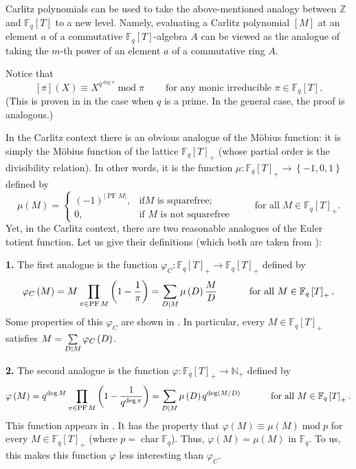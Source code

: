 \documentclass[numbers=enddot,12pt,final,onecolumn,notitlepage]{scrartcl}%
\theoremstyle{definition}
\let\sumnonlimits\sum
\let\prodnonlimits\prod
\renewcommand{\sum}{\sumnonlimits\limits}
\renewcommand{\prod}{\prodnonlimits\limits}
\begin{document}
Carlitz polynomials can be used to take the above-mentioned analogy between
$\mathbb{Z}$ and $\mathbb{F}_{q}\left[  T\right]  $ to a new level. Namely,
evaluating a Carlitz polynomial $\left[  M\right]  $ at an element $a$ of a
commutative $\mathbb{F}_{q}\left[  T\right]  $-algebra $A$ can be viewed as
the analogue of taking the $m$-th power of an element $a$ of a commutative
ring $A$.

Notice that%
\begin{equation}
\left[  \pi\right]  \left(  X\right)  \equiv X^{q^{\deg\pi}}\operatorname{mod}%
\pi\ \ \ \ \ \ \ \ \ \ \text{for any monic irreducible }\pi\in\mathbb{F}%
_{q}\left[  T\right]  . \label{carlitz-piX}%
\end{equation}
(This is proven in \cite[Theorem 2.11]{kc-carlitz} in the case when $q$ is a
prime. In the general case, the proof is analogous.)

In the Carlitz context there is an obvious analogue of the M\"{o}bius
function: it is simply the M\"{o}bius function of the lattice $\mathbb{F}%
_{q}\left[  T\right]  _{+}$ (whose partial order is the divisibility
relation). In other words, it is the function $\mu:\mathbb{F}_{q}\left[
T\right]  _{+}\rightarrow\left\{  -1,0,1\right\}  $ defined by%
\[
\mu\left(  M\right)  =%
\begin{cases}
\left(  -1\right)  ^{\left\vert \operatorname*{PF}M\right\vert }, & \text{if
}M\text{ is squarefree;}\\
0, & \text{if }M\text{ is not squarefree}%
\end{cases}
\ \ \ \ \ \ \ \ \ \ \text{for all }M\in\mathbb{F}_{q}\left[  T\right]  _{+}.
\]
Yet, in the Carlitz context, there are two reasonable analogues of the Euler
totient function. Let us give their definitions (which both are taken from
\cite{kc-carlitz}):

\textbf{1.} The first analogue is the function $\varphi_{C}:\mathbb{F}%
_{q}\left[  T\right]  _{+}\rightarrow\mathbb{F}_{q}\left[  T\right]  _{+}$
defined by%
\[
\varphi_{C}\left(  M\right)  =M\prod\limits_{\pi\in\operatorname*{PF}M}\left(
1-\dfrac{1}{\pi}\right)  =\sum\limits_{D\mid M}\mu\left(  D\right)  \dfrac
{M}{D}\ \ \ \ \ \ \ \ \ \ \text{for all }M\in\mathbb{F}_{q}\left[  T\right]
_{+}.
\]
Some properties of this $\varphi_{C}$ are shown in \cite[Theorem
4.5]{kc-carlitz}. In particular, every $M\in\mathbb{F}_{q}\left[  T\right]
_{+}$ satisfies $M=\sum\limits_{D\mid M}\varphi_{C}\left(  D\right)  $.

\textbf{2.} The second analogue is the function $\varphi:\mathbb{F}_{q}\left[
T\right]  _{+}\rightarrow\mathbb{N}_{+}$ defined by%
\[
\varphi\left(  M\right)  =q^{\deg M}\prod\limits_{\pi\in\operatorname*{PF}%
M}\left(  1-\dfrac{1}{q^{\deg\pi}}\right)  =\sum\limits_{D\mid M}\mu\left(
D\right)  q^{\deg\left(  M / D\right)  }\ \ \ \ \ \ \ \ \ \ \text{for all
}M\in\mathbb{F}_{q}\left[  T\right]  _{+}.
\]
This function appears in \cite[Section 6]{kc-carlitz}. It has the property
that $\varphi\left(  M\right)  \equiv\mu\left(  M\right)  \operatorname{mod}p$
for every $M\in\mathbb{F}_{q}\left[  T\right]  _{+}$ (where
$p=\operatorname*{char}\mathbb{F}_{q}$). Thus, $\varphi\left(  M\right)
=\mu\left(  M\right)  $ in $\mathbb{F}_{q}$. To us, this makes this function
$\varphi$ less interesting than $\varphi_{C}$.
\end{document}
